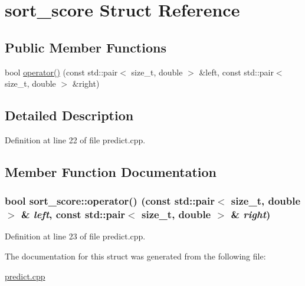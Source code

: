 \hypertarget{structsort__score}{
\section{sort\_\-score Struct Reference}
\label{structsort__score}
}
\subsection*{Public Member Functions}
\begin{DoxyCompactItemize}
\item 
bool \hyperlink{structsort__score_afbf28710bf07b7120eeb49a53460de1b}{operator()} (const std::pair$<$ size\_\-t, double $>$ \&left, const std::pair$<$ size\_\-t, double $>$ \&right)
\end{DoxyCompactItemize}


\subsection{Detailed Description}


Definition at line 22 of file predict.cpp.



\subsection{Member Function Documentation}
\hypertarget{structsort__score_afbf28710bf07b7120eeb49a53460de1b}{
\subsubsection[{operator()}]{\setlength{\rightskip}{0pt plus 5cm}bool sort\_\-score::operator() (const std::pair$<$ size\_\-t, double $>$ \& {\em left}, \/  const std::pair$<$ size\_\-t, double $>$ \& {\em right})}}
\label{structsort__score_afbf28710bf07b7120eeb49a53460de1b}


Definition at line 23 of file predict.cpp.



The documentation for this struct was generated from the following file:\begin{DoxyCompactItemize}
\item 
\hyperlink{predict_8cpp}{predict.cpp}\end{DoxyCompactItemize}
